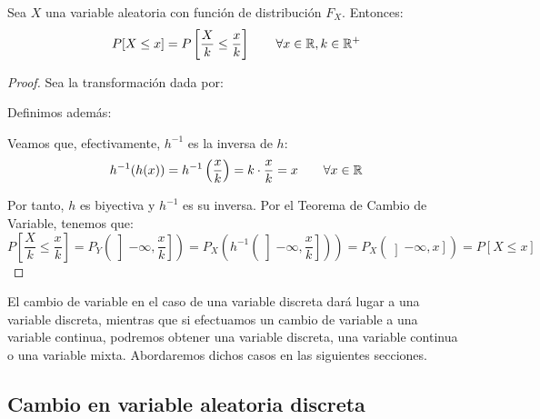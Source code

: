\begin{coro}
    Sea $X$ una variable aleatoria con función de distribución $F_X$. Entonces:
    \begin{equation*}
        P[X\leq x] = P\left[\frac{X}{k} \leq \frac{x}{k}\right]\qquad \forall x\in \mathbb{R}, k\in \mathbb{R}^+
    \end{equation*}
\end{coro}
\begin{proof}
    Sea la transformación dada por:
    
    Definimos además:

    Veamos que, efectivamente, $h^{-1}$ es la inversa de $h$:
    $$h^{-1}(h(x)) = h^{-1}\left(\frac{x}{k}\right) = k\cdot \frac{x}{k} = x\qquad \forall x \in \mathbb R$$

    Por tanto, $h$ es biyectiva y $h^{-1}$ es su inversa. Por el Teorema de Cambio de Variable, tenemos que:
    $$P\left[\frac{X}{k} \leq \frac{x}{k}\right] = P_Y\left(\left]-\infty, \frac{x}{k}\right]\right) = P_X\left(h^{-1}\left(\left]-\infty, \frac{x}{k}\right]\right)\right) = P_X(\left]-\infty, x\right]) = P[X\leq x]$$
\end{proof}

El cambio de variable en el caso de una variable discreta dará lugar a una variable discreta, mientras que
si efectuamos un cambio de variable a una variable continua, podremos obtener una variable discreta, una
variable continua o una variable mixta. Abordaremos dichos casos en las siguientes secciones.
\subsection{Cambio en variable aleatoria discreta}\label{subsec:CV_Discreta}

